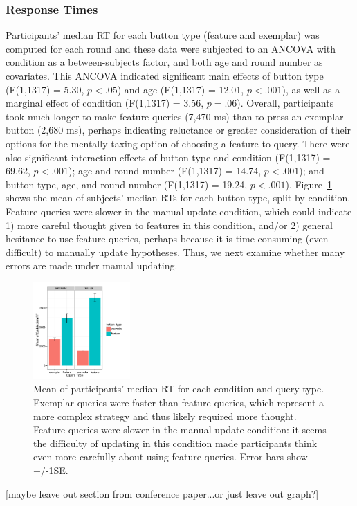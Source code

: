 \documentclass[10pt,letterpaper]{article}
\begin{document}
\subsubsection{Response Times}

Participants' median RT for each button type (feature and exemplar) was computed for each round and these data were subjected to an ANCOVA with condition as a between-subjects factor, and both age and round number as covariates. This ANCOVA indicated significant main effects of button type (F(1,1317) = 5.30, $p<.05$) and age (F(1,1317) = 12.01, $p<.001$), as well as a marginal effect of condition (F(1,1317) = 3.56, $p = .06$). Overall, participants took much longer to make feature queries (7,470 ms) than to press an exemplar button (2,680 ms), perhaps indicating reluctance or greater consideration of their options for the mentally-taxing option of choosing a feature to query. There were also significant interaction effects of button type and condition (F(1,1317) = 69.62, $p<.001$); age and round number (F(1,1317) = 14.74, $p<.001$); and button type, age, and round number (F(1,1317) = 19.24, $p<.001$). Figure~\ref{fig:basic-rt} shows the mean of subjects' median RTs for each button type, split by condition. Feature queries were slower in the manual-update condition, which could indicate 1) more careful thought given to features in this condition, and/or 2) general hesitance to use feature queries, perhaps because it is time-consuming (even difficult) to manually update hypotheses. Thus, we next examine whether many errors are made under manual updating.

\begin{figure}[!h]
  \centering
  \includegraphics[width=0.33\textwidth]{figures/RT_by_condition_query_type}
  \caption{Mean of participants' median RT for each condition and query type. Exemplar queries were faster than feature queries, which represent a more complex strategy and thus likely required more thought. Feature queries were slower in the manual-update condition: it seems the difficulty of updating in this condition made participants think even more carefully about using feature queries. Error bars show +/-1SE.}
  \label{fig:basic-rt}
\end{figure} 
[maybe leave out section from conference paper...or just leave out graph?]
\end{document}
